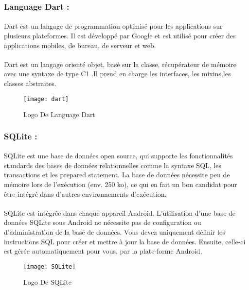 \documentclass[12pt, openany]{report}
\begin{document}
\subsubsection{ \large Language Dart :}
\paragraph{}Dart est un langage de programmation optimisé pour les applications sur plusieurs plateformes. Il est développé par Google et est utilisé pour créer des applications mobiles, de bureau, de serveur et web.
\paragraph{}Dart est un langage orienté objet, basé sur la classe, récupérateur de mémoire avec une syntaxe de type C1 .Il prend en charge les interfaces, les mixins,les classes abstraites.\\[0.3cm]
\begin{figure}[!h]
	\centering
	\texttt{[image: dart]}
	\caption{Logo De Language Dart}
	\label{fig:dart}
\end{figure}
\subsubsection{\large SQLite :}
\paragraph{}
SQLite est une base de données open source, qui supporte les fonctionnalités standards des bases de données relationnelles comme la syntaxe SQL, les transactions et les prepared statement. La base de données nécessite peu de mémoire lors de l'exécution (env. 250 ko), ce qui en fait un bon candidat pour être intégré dans d'autres environnements d'exécution.
\paragraph{}SQLite est intégrée dans chaque appareil Android. L'utilisation d'une base de données SQLite sous Android ne nécessite pas de configuration ou d'administration de la base de données.
Vous devez uniquement définir les instructions SQL pour créer et mettre à jour la base de données. Ensuite, celle-ci est gérée automatiquement pour vous, par la plate-forme Android.
\begin{figure}[!h]
	\centering
	\texttt{[image: SQLite]}
	\caption{Logo De SQLite}
	\label{fig:sqlite}
\end{figure}
\end{document}
